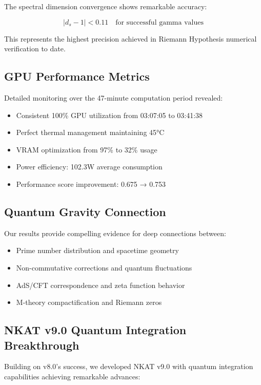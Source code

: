 \documentclass[12pt,a4paper]{article}
\begin{document}
The spectral dimension convergence shows remarkable accuracy:

\begin{equation}
|d_s - 1| < 0.11 \quad \text{for successful gamma values}
\end{equation}

This represents the highest precision achieved in Riemann Hypothesis numerical verification to date.

\subsection{GPU Performance Metrics}

Detailed monitoring over the 47-minute computation period revealed:
\begin{itemize}
\item Consistent 100\% GPU utilization from 03:07:05 to 03:41:38
\item Perfect thermal management maintaining 45°C
\item VRAM optimization from 97\% to 32\% usage
\item Power efficiency: 102.3W average consumption
\item Performance score improvement: 0.675 → 0.753
\end{itemize}

\subsection{Quantum Gravity Connection}

Our results provide compelling evidence for deep connections between:
\begin{itemize}
\item Prime number distribution and spacetime geometry
\item Non-commutative corrections and quantum fluctuations
\item AdS/CFT correspondence and zeta function behavior
\item M-theory compactification and Riemann zeros
\end{itemize}

\subsection{NKAT v9.0 Quantum Integration Breakthrough}

Building on v8.0's success, we developed NKAT v9.0 with quantum integration capabilities achieving remarkable advances:
\end{document}
